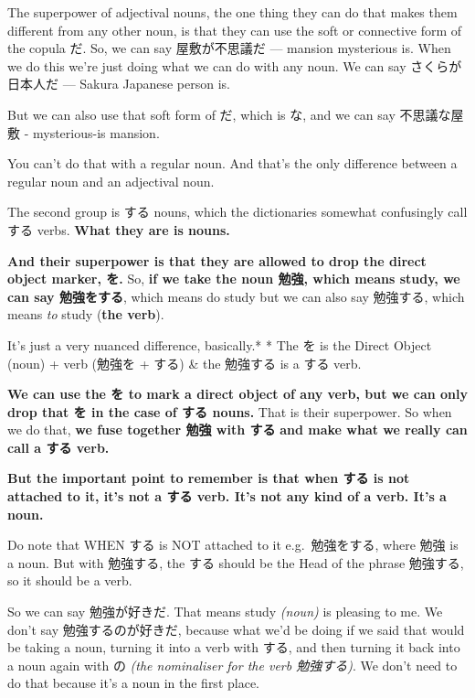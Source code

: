 {}

The superpower of adjectival nouns, the one thing they can do that makes them different from any other noun, is that they can use the soft or connective form of the copula だ. So, we can say 屋敷が不思議だ --- mansion mysterious is. When we do this we're just doing what we can do with any noun. We can say さくらが日本人だ --- Sakura Japanese person is.

But we can also use that soft form of だ, which is な, and we can say 不思議な屋敷 - mysterious-is mansion.

{}

You can't do that with a regular noun. And that's the only difference between a regular noun and an adjectival noun.

\stopsectionlevel

\startsectionlevel[title={する nouns},reference={する-nouns}]

The second group is する nouns, which the dictionaries somewhat confusingly call する verbs. {\bf What they are is nouns.}

{}

{\bf And their superpower is that they are allowed to drop the direct object marker, を.} So, {\bf if we take the noun 勉強, which means study, we can say 勉強をする}, which means do study but we can also say 勉強する, which means {\em to} study ({\bf the verb}).

It's just a very nuanced difference, basically.* * The を is the Direct Object (noun) + verb (勉強を + する) & the 勉強する is a する verb.

{\bf We can use the を to mark a direct object of any verb, but we can only drop that を in the case of する nouns.} That is their superpower. So when we do that, {\bf we fuse together 勉強 with する} {\bf and make what we really can call a する verb.}

{\bf But the important point to remember is that when する is not attached to it, it's not a する verb. It's not any kind of a verb. It's a noun.}

Do note that WHEN する is NOT attached to it e.g.~勉強をする, where 勉強 is a noun. But with 勉強する, the する should be the Head of the phrase 勉強する, so it should be a verb.

So we can say 勉強が好きだ. That means study {\em (noun)} is pleasing to me. We don't say 勉強するのが好きだ, because what we'd be doing if we said that would be taking a noun, turning it into a verb with する, and then turning it back into a noun again with の {\em (the nominaliser for the verb 勉強する)}. We don't need to do that because it's a noun in the first place.

